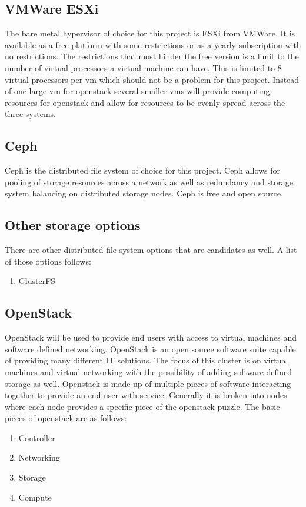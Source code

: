 \documentclass[12pt]{article}
\begin{document}
\subsection{VMWare ESXi}
The bare metal hypervisor of choice for this project is ESXi from VMWare. It is available as a free platform with some restrictions
or as a yearly subscription with no restrictions. The restrictions that most hinder the free version is a limit to the number of
virtual processors a virtual machine can have. This is limited to 8 virtual processors per vm which should not be a problem for this
project. Instead of one large vm for openstack several smaller vms will provide computing resources for openstack and allow for resources
to be evenly spread across the three systems.
\\
\subsection{Ceph}
Ceph is the distributed file system of choice for this project. Ceph allows for pooling of storage resources across a network as well as
redundancy and storage system balancing on distributed storage nodes. Ceph is free and open source.
\\
\subsection{Other storage options}
There are other distributed file system options that are candidates as well. A list of those options follows:
\begin{enumerate}
	\item GlusterFS
	
\end{enumerate}

\subsection{OpenStack}

OpenStack will be used to provide end users with access to virtual machines and software defined networking. OpenStack is an
open source software suite capable of providing many different IT solutions. The focus of this cluster is on virtual machines
and virtual networking with the possibility of adding software defined storage as well. Openstack is made up of multiple pieces
of software interacting together to provide an end user with service. Generally it is broken into nodes where each node provides
a specific piece of the openstack puzzle. The basic pieces of openstack are as follows:
\begin{enumerate}
	\item{Controller}
	\item{Networking}
	\item{Storage}
	\item{Compute}
\end{enumerate}
\end{document}
